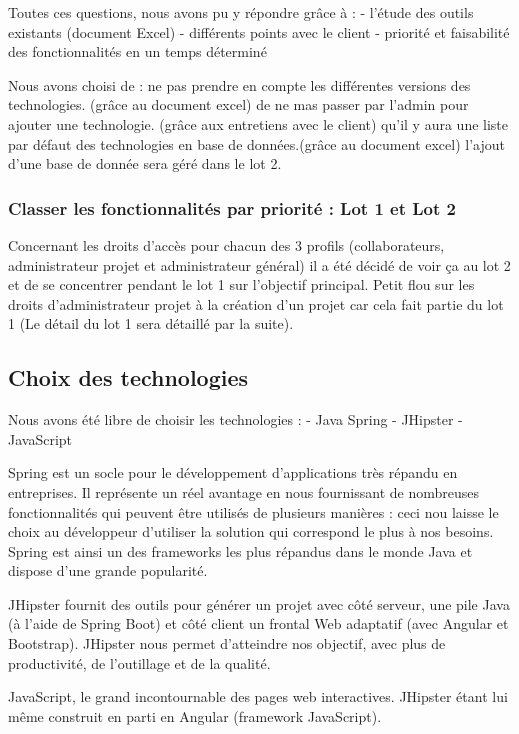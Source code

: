 Toutes ces questions, nous avons pu y répondre grâce à :
- l'étude des outils existants (document Excel)
- différents points avec le client
- priorité et faisabilité des fonctionnalités en un temps déterminé

Nous avons choisi de :
ne pas prendre en compte les différentes versions des technologies. (grâce au document excel)
de ne mas passer par l'admin pour ajouter une technologie. (grâce aux entretiens avec le client)
qu'il y aura une liste par défaut des technologies en base de données.(grâce au document excel)
l'ajout d'une base de donnée sera géré dans le lot 2.

\subsubsection{Classer les fonctionnalités par priorité : Lot 1 et Lot 2}
Concernant les droits d’accès pour chacun des 3 profils (collaborateurs, administrateur projet et administrateur général) il a été décidé de voir ça au lot 2 et de se concentrer pendant le lot 1 sur l’objectif principal. Petit flou sur les droits d’administrateur projet à la création d’un projet car cela fait partie du lot 1 (Le détail du lot 1 sera détaillé par la suite).


\subsection{Choix des technologies}

Nous avons été libre de choisir les technologies : 
- Java Spring 
- JHipster 
- JavaScript

Spring est un socle pour le développement d'applications très répandu en entreprises. Il représente un réel avantage en nous fournissant de nombreuses fonctionnalités qui peuvent être utilisés de plusieurs manières : ceci nou laisse le choix au développeur d'utiliser la solution qui correspond le plus à nos besoins.
Spring est ainsi un des frameworks les plus répandus dans le monde Java et dispose d'une grande popularité.

JHipster fournit des outils pour générer un projet avec côté serveur, une pile Java (à l'aide de Spring Boot) et côté client un frontal Web adaptatif (avec Angular et Bootstrap).
JHipster nous permet d'atteindre nos objectif, avec plus de productivité, de l'outillage et de la qualité.

JavaScript, le grand incontournable des pages web interactives. JHipster étant lui même construit en parti en Angular (framework JavaScript).

